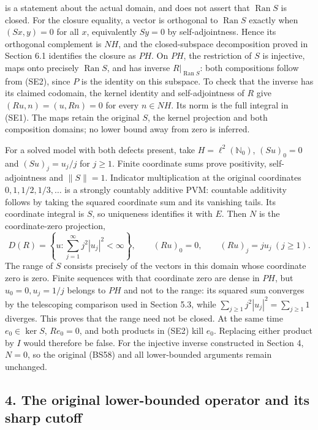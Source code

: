 \documentclass[
  11pt,
]{article}
\begin{document}
is a statement about the actual domain, and does not assert that
\(\operatorname{Ran}S\) is closed. For the closure equality, a vector is
orthogonal to \(\operatorname{Ran}S\) exactly when \((Sx,y)=0\) for all
\(x\), equivalently \(Sy=0\) by self-adjointness. Hence its orthogonal
complement is \(NH\), and the closed-subspace decomposition proved in
Section 6.1 identifies the closure as \(PH\). On \(PH\), the restriction
of \(S\) is injective, maps onto precisely \(\operatorname{Ran}S\), and
has inverse \(R|_{\operatorname{Ran}S}\): both compositions follow from
(SE2), since \(P\) is the identity on this subspace. To check that the
inverse has its claimed codomain, the kernel identity and
self-adjointness of \(R\) give \((Ru,n)=(u,Rn)=0\) for every
\(n\in NH\). Its norm is the full integral in (SE1). The maps retain the
original \(S\), the kernel projection and both composition domains; no
lower bound away from zero is inferred.

For a solved model with both defects present, take
\(H=\ell^2(\mathbb N_0)\), \((Su)_0=0\) and \((Su)_j=u_j/j\) for
\(j\geq1\). Finite coordinate sums prove positivity, self-adjointness
and \(\|S\|=1\). Indicator multiplication at the original coordinates
\(0,1,1/2,1/3,\ldots\) is a strongly countably additive PVM: countable
additivity follows by taking the squared coordinate sum and its
vanishing tails. Its coordinate integral is \(S\), so uniqueness
identifies it with \(E\). Then \(N\) is the coordinate-zero projection,
\[
 D(R)=\left\{u:\sum_{j=1}^{\infty}j^2|u_j|^2<\infty\right\},
 \qquad (Ru)_0=0,\qquad (Ru)_j=ju_j\ (j\geq1).
 \tag{SE4}
\] The range of \(S\) consists precisely of the vectors in this domain
whose coordinate zero is zero. Finite sequences with that coordinate
zero are dense in \(PH\), but \(u_0=0,u_j=1/j\) belongs to \(PH\) and
not to the range: its squared sum converges by the telescoping
comparison used in Section 5.3, while
\(\sum_{j\geq1}j^2|u_j|^2=\sum_{j\geq1}1\) diverges. This proves that
the range need not be closed. At the same time \(e_0\in\ker S\),
\(Re_0=0\), and both products in (SE2) kill \(e_0\). Replacing either
product by \(I\) would therefore be false. For the injective inverse
constructed in Section 4, \(N=0\), so the original (BS58) and all
lower-bounded arguments remain unchanged.

\subsection{4. The original lower-bounded operator and its sharp
cutoff}\label{the-original-lower-bounded-operator-and-its-sharp-cutoff}
\end{document}
